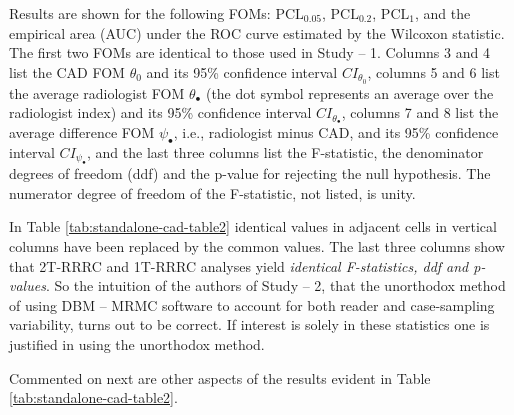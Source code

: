 \documentclass[
]{book}
\begin{document}
Results are shown for the following FOMs: \(\text{PCL}_{0.05}\), \(\text{PCL}_{0.2}\), \(\text{PCL}_{1}\), and the empirical area (AUC) under the ROC curve estimated by the Wilcoxon statistic. The first two FOMs are identical to those used in Study -- 1. Columns 3 and 4 list the CAD FOM \(\theta_0\) and its 95\% confidence interval \(CI_{\theta_0}\), columns 5 and 6 list the average radiologist FOM \(\theta_{\bullet}\) (the dot symbol represents an average over the radiologist index) and its 95\% confidence interval \(CI_{\theta_{\bullet}}\), columns 7 and 8 list the average difference FOM \(\psi_{\bullet}\), i.e., radiologist minus CAD, and its 95\% confidence interval \(CI_{\psi_{\bullet}}\), and the last three columns list the F-statistic, the denominator degrees of freedom (ddf) and the p-value for rejecting the null hypothesis. The numerator degree of freedom of the F-statistic, not listed, is unity.

In Table \ref{tab:standalone-cad-table2} identical values in adjacent cells in vertical columns have been replaced by the common values. The last three columns show that 2T-RRRC and 1T-RRRC analyses yield \emph{identical F-statistics, ddf and p-values}. So the intuition of the authors of Study -- 2, that the unorthodox method of using DBM -- MRMC software to account for both reader and case-sampling variability, turns out to be correct. If interest is solely in these statistics one is justified in using the unorthodox method.

Commented on next are other aspects of the results evident in Table \ref{tab:standalone-cad-table2}.
\end{document}
